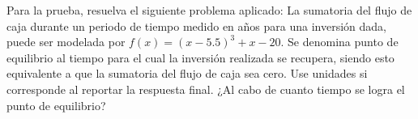 \documentclass[12pt]{article}
\begin{document}
\begin{enumerate}[leftmargin=*,widest=9]
Para la prueba, resuelva el siguiente problema aplicado: La sumatoria del flujo de caja durante un periodo de tiempo medido en años para una inversión dada, puede ser modelada por \(f(x) = (x-5.5)^3 + x - 20\). Se denomina punto de equilibrio al tiempo para el cual la inversión realizada se recupera, siendo esto equivalente a que la sumatoria del flujo de caja sea cero. Use unidades si corresponde al reportar la respuesta final. ¿Al cabo de cuanto tiempo se logra el punto de equilibrio?

\end{enumerate}
\end{document}

